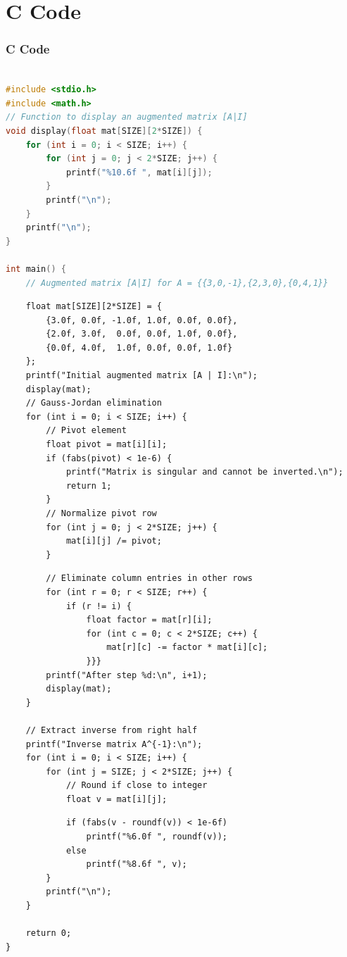 \documentclass{beamer}
\theoremstyle{remark}
\numberwithin{equation}{section}
\begin{document}
\section{C Code}
\begin{frame}[fragile]
\frametitle{C Code }
\begin{lstlisting}[language=C]  
 
#include <stdio.h>
#include <math.h>
// Function to display an augmented matrix [A|I]
void display(float mat[SIZE][2*SIZE]) {
    for (int i = 0; i < SIZE; i++) {
        for (int j = 0; j < 2*SIZE; j++) {
            printf("%10.6f ", mat[i][j]);
        }
        printf("\n");
    }
    printf("\n");
}

int main() {
    // Augmented matrix [A|I] for A = {{3,0,-1},{2,3,0},{0,4,1}}
    \end{lstlisting}
    \end{frame}
    \begin{frame}[fragile]
    \begin{lstlisting}
    float mat[SIZE][2*SIZE] = {
        {3.0f, 0.0f, -1.0f, 1.0f, 0.0f, 0.0f},
        {2.0f, 3.0f,  0.0f, 0.0f, 1.0f, 0.0f},
        {0.0f, 4.0f,  1.0f, 0.0f, 0.0f, 1.0f}
    };
    printf("Initial augmented matrix [A | I]:\n");
    display(mat);
    // Gauss-Jordan elimination
    for (int i = 0; i < SIZE; i++) {
        // Pivot element
        float pivot = mat[i][i];
        if (fabs(pivot) < 1e-6) {
            printf("Matrix is singular and cannot be inverted.\n");
            return 1;
        }
        // Normalize pivot row
        for (int j = 0; j < 2*SIZE; j++) {
            mat[i][j] /= pivot;
        }
\end{lstlisting}
\end{frame}
\begin{frame}[fragile]
\begin{lstlisting}
        // Eliminate column entries in other rows
        for (int r = 0; r < SIZE; r++) {
            if (r != i) {
                float factor = mat[r][i];
                for (int c = 0; c < 2*SIZE; c++) {
                    mat[r][c] -= factor * mat[i][c];
                }}}
        printf("After step %d:\n", i+1);
        display(mat);
    }

    // Extract inverse from right half
    printf("Inverse matrix A^{-1}:\n");
    for (int i = 0; i < SIZE; i++) {
        for (int j = SIZE; j < 2*SIZE; j++) {
            // Round if close to integer
            float v = mat[i][j];
\end{lstlisting}
\end{frame}
\begin{frame}[fragile]
\begin{lstlisting}
            if (fabs(v - roundf(v)) < 1e-6f)
                printf("%6.0f ", roundf(v));
            else
                printf("%8.6f ", v);
        }
        printf("\n");
    }

    return 0;
}

\end{lstlisting}
\end{frame}
\end{document}

